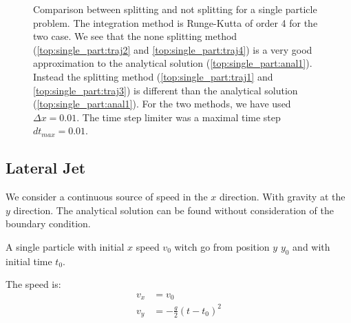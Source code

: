 \begin{figure}
\caption{Comparison between splitting and not splitting for a single particle problem. 
The integration method is Runge-Kutta of order 4 for the two case.
We see that the none splitting method (\ref{top:single_part:traj2} and \ref{top:single_part:traj4}) is a very good approximation to the analytical solution (\ref{top:single_part:anal1}).
Instead the splitting method (\ref{top:single_part:traj1} and \ref{top:single_part:traj3}) is different than the analytical solution (\ref{top:single_part:anal1}).
For the two methods, we have used $\Delta x=0.01$. The time step limiter was a maximal time step $dt_{max}=0.01$.
}
\label{topo:singl_part:fig1}
\end{figure}

\subsection{Lateral Jet}

We consider a continuous source of speed in the $x$ direction. With gravity at the $y$ direction.
The analytical solution can be found without consideration of the boundary condition.

A single particle with initial $x$ speed $v_{0}$ witch go from position $y$ $y_0$ and with initial time $t_0$.

The speed is:
\begin{align}
	v_{x}&=v_{0}\\
	v_{y}&=-\frac{g}{2}(t-t_0)^2
\end{align}

